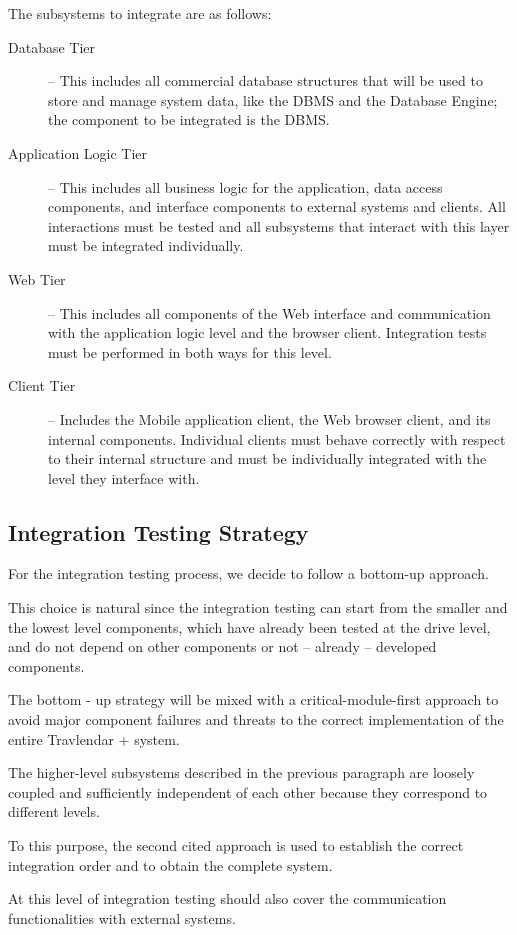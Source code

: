 \documentclass{article}
\begin{document}
	The subsystems to integrate are as follows:
	\begin{description}
	\item [Database Tier] -- This includes all commercial database structures that will be used to store and manage system data, like the DBMS and the Database Engine; the component to be integrated is the DBMS.
	\item [Application Logic Tier] -- This includes all business logic for the application, data access components, and interface components to external systems and clients. All interactions must be tested and all subsystems that interact with this layer must be integrated individually.
	\item [Web Tier] -- This includes all components of the Web interface and communication with the application logic level and the browser client. Integration tests must be performed in both ways for this level.
	\item [Client Tier] -- Includes the Mobile application client, the Web browser client, and its internal components. Individual clients must behave correctly with respect to their internal structure and must be individually integrated with the level they interface with.
	\end{description}

	\subsection{Integration Testing Strategy}
	For the integration testing process, we decide to follow a bottom-up approach.
	
	This choice is natural since the integration testing can start from the smaller and the lowest level components, which have already been tested at the drive level, and do not depend on other components or not – already – developed components.
	
	The bottom - up strategy will be mixed with a critical-module-first approach to avoid major component failures and threats to the correct implementation of the entire Travlendar + system.
	
	The higher-level subsystems described in the previous paragraph are loosely coupled and sufficiently independent of each other because they correspond to different levels.
	
	To this purpose, the second cited approach is used to establish the correct integration order and to obtain the complete system.
	
	At this level of integration testing should also cover the communication functionalities with external systems.
\end{document}
